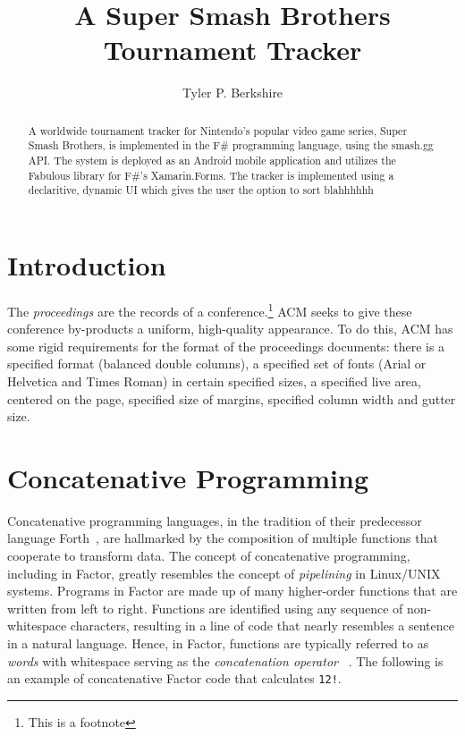 \documentclass[sigconf]{acmart}
\begin{document}
\title{A Super Smash Brothers Tournament Tracker}
\author{Tyler P. Berkshire}

\renewcommand{\shortauthors}{T.P. Berkshire}

\begin{abstract}
A worldwide tournament tracker for Nintendo's popular video game series, Super Smash Brothers, is implemented in the F# programming language, using the smash.gg API. The system is deployed as an Android mobile application and utilizes the Fabulous library for F#'s Xamarin.Forms. The tracker is implemented using a declaritive, dynamic UI which gives the user the option to sort blahhhhhh 
\end{abstract}


\maketitle

\section{Introduction}

The \textit{proceedings} are the records of a conference.\footnote{This
  is a footnote}  ACM seeks
to give these conference by-products a uniform, high-quality
appearance.  To do this, ACM has some rigid requirements for the
format of the proceedings documents: there is a specified format
(balanced double columns), a specified set of fonts (Arial or
Helvetica and Times Roman) in certain specified sizes, a specified
live area, centered on the page, specified size of margins, specified
column width and gutter size.

\section{Concatenative Programming}

Concatenative programming languages, in the tradition of their
predecessor language Forth~\cite{koopman:forth}, are hallmarked
by the composition of multiple functions that cooperate to
transform data. The concept of concatenative programming,
including in Factor, greatly resembles the concept of 
\textit{pipelining} in Linux/UNIX systems. Programs in Factor 
are made up of many higher-order functions that are written 
from left to right. Functions are identified using any sequence 
of non-whitespace characters, resulting in a line of code that 
nearly resembles a sentence in a natural language. Hence, in 
Factor, functions are typically referred to as \textit{words} 
with whitespace serving as the \textit{concatenation operator}
~\cite{pestov:Factor}. The following is an example of 
concatenative Factor code that calculates \texttt{12!}.
\end{document}
